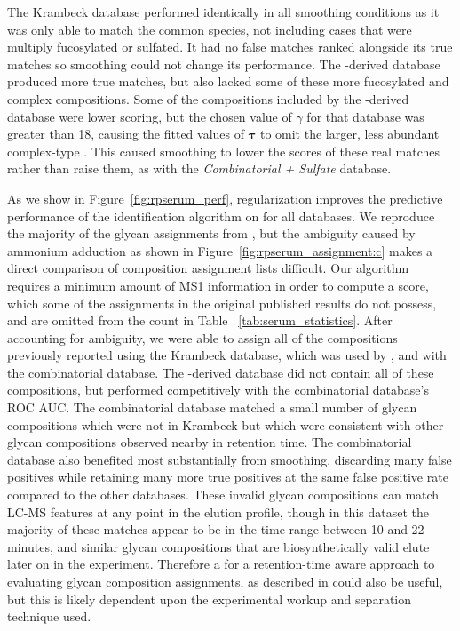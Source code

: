     The Krambeck database performed identically in all smoothing conditions as it
    was only able to match the common species, not including cases that were multiply
    fucosylated or sulfated. It had no false matches ranked alongside its true matches so
    smoothing could not change its performance. The \glyspace-derived database produced more true
    matches, but also lacked some of these more fucosylated and complex compositions. Some of the
    compositions included by the \glyspace-derived database were lower scoring, but the chosen
    value of $\gamma$ for that database was greater than 18, causing the fitted values of $\mathbf{\tau}$
    to omit the larger, less abundant complex-type \nglycans. This caused smoothing to lower the scores
    of these real matches rather than raise them, as with the \textit{Combinatorial + Sulfate} database.

    As we show in Figure~\ref{fig:rpserum_perf}, regularization improves the
    predictive performance of the identification algorithm on \rpserum for all databases.
    We reproduce the majority of the glycan assignments from \cite{Yu2013}, but the ambiguity
    caused by ammonium adduction as shown in Figure~\ref{fig:rpserum_assignment:c} makes a
    direct comparison of composition assignment lists difficult. Our algorithm requires a minimum
    amount of MS1 information in order to compute a score, which some of the assignments in the
    original published results do not possess, and are omitted from the count in Table~
    \ref{tab:serum_statistics}. After accounting for ambiguity, we were able to assign all
    of the compositions previously reported using the Krambeck database, which was used
    by \cite{Yu2013}, and with the combinatorial database. The \glyspace-derived database did not
    contain all of these compositions, but performed competitively with the combinatorial
    database's ROC AUC. The combinatorial database matched a small number of glycan compositions
    which were not in Krambeck but which were consistent with other glycan compositions
    observed nearby in retention time. The combinatorial database also benefited most
    substantially from smoothing, discarding many false positives while retaining many more
    true positives at the same false positive rate compared to the other databases. These
    invalid glycan compositions can match LC-MS features at any point in the elution profile,
    though in this dataset the majority of these matches appear to be in the time range between
    10 and 22 minutes, and similar glycan compositions that are biosynthetically valid elute
    later on in the experiment. Therefore a for a retention-time aware approach to evaluating glycan
    composition assignments, as described in \cite{Hu2016} could also be useful, but this is
    likely dependent upon the experimental workup and separation technique used.

